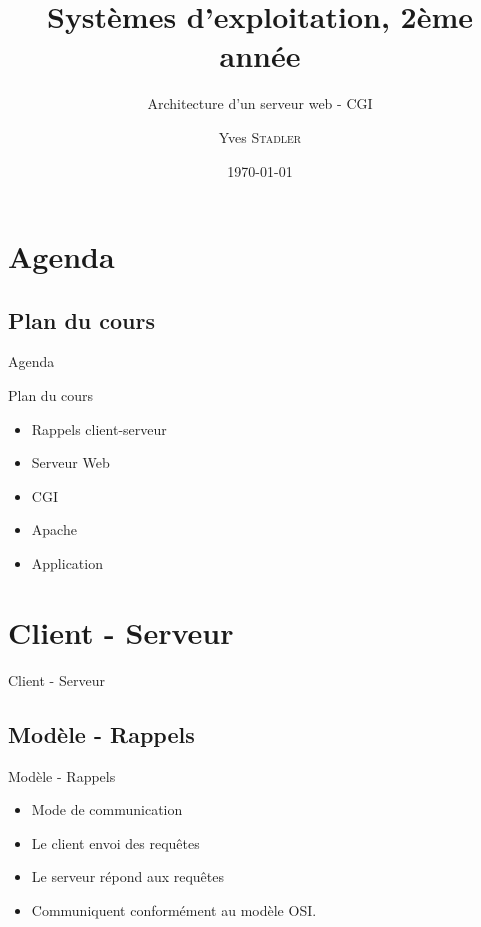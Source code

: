 \title{Systèmes d'exploitation, 2ème année}
\subtitle{Architecture d'un serveur web - CGI}

\author{Yves \textsc{Stadler}}

\date{\today}



\begin{frame}
\titlepage
\end{frame}

\def\sectitle{Agenda}
\section{\sectitle}
\def\subsectitle{Plan du cours}
\subsection{\subsectitle}

\begin{frame}{\sectitle}
\begin{block}{\subsectitle}
\begin{itemize}
    \item Rappels client-serveur
    \item Serveur Web
    \item CGI
    \item Apache
    \item Application
\end{itemize}
\end{block}
\end{frame}

\def\sectitle{Client - Serveur}
\section{\sectitle}
\begin{frame}{\sectitle}
    \def\subsectitle{Modèle - Rappels}
    \subsection{\subsectitle}
    \begin{block}{\subsectitle}
        \begin{itemize}
            \item Mode de communication
            \item Le client envoi des requêtes
            \item Le serveur répond aux requêtes
            \item Communiquent conformément au modèle OSI.
        \end{itemize}
    \end{block}
\end{frame}

